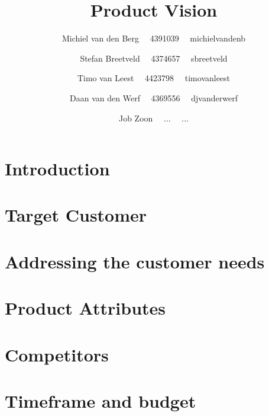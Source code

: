 \documentclass[a4paper]{article}
\title{Product Vision}
\author{ 	Michiel van den Berg \ \ 4391039 \ \ michielvandenb
		\and Stefan Breetveld \ \ 4374657 \ \ sbreetveld
  		\and Timo van Leest \ \ 4423798 \ \ timovanleest
		\and Daan van den Werf \ \ 4369556 \ \ djvanderwerf
   		\and Job Zoon \ \ ... \ \ ...  }
\begin{document}
\maketitle

\newpage
\tableofcontents

\newpage
\section{Introduction}

\newpage
\section{Target Customer}

\newpage
\section{Addressing the customer needs}

\newpage
\section{Product Attributes}

\newpage
\section{Competitors}

\newpage
\section{Timeframe and budget}
\end{document}
